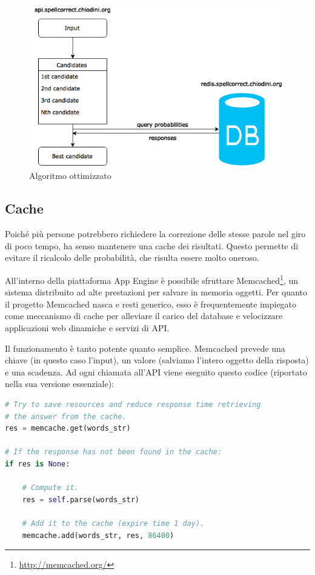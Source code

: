 \begin{figure}[h]
\centering
\includegraphics[width=\textwidth]{Figures/improved_algorithm.png}
\caption{Algoritmo ottimizzato}
\end{figure}
\subsection{Cache}
\label{cache}
Poiché più persone potrebbero richiedere la correzione delle stesse parole nel giro di poco tempo, ha senso mantenere una cache dei risultati. Questo permette di evitare il ricalcolo delle probabilità, che risulta essere molto oneroso.

All'interno della piattaforma App Engine è possibile sfruttare Memcached\footnote{\url{http://memcached.org/}}, un sistema distribuito ad alte prestazioni per salvare in memoria oggetti. Per quanto il progetto Memcached nasca e resti generico, esso è frequentemente impiegato come meccanismo di cache per alleviare il carico del database e velocizzare applicazioni web dinamiche e servizi di API.

Il funzionamento è tanto potente quanto semplice. Memcached prevede una chiave (in questo caso l'input), un valore (salviamo l'intero oggetto della risposta) e una scadenza. Ad ogni chiamata all'API viene eseguito questo codice (riportato nella sua versione essenziale):
\begin{lstlisting}[language=Python, numbers=none]
# Try to save resources and reduce response time retrieving
# the answer from the cache.
res = memcache.get(words_str)

# If the response has not been found in the cache:
if res is None:

    # Compute it.
    res = self.parse(words_str)
    
    # Add it to the cache (expire time 1 day).
    memcache.add(words_str, res, 86400)
\end{lstlisting}
